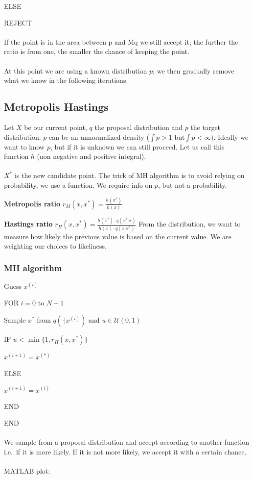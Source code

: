 ELSE

REJECT
\\
\\
\noindent
If the point is in the area between p and Mq we still accept it; the
further the ratio is from one, the smaller the chance of keeping the
point.
\\
\\
\noindent
At this point we are using a known distribution $p$; we then gradually
remove what we know in the following iterations.


\subsection{Metropolis Hastings}

Let $X$ be our current point, $q$ the proposal distribution and $p$ the
target distribution. $p$ can be an unnormalized density
($\int p > 1 \text{ but} \int p < \infty)$. Ideally we want to know $p$,
but if it is unknown we can still proceed. Let us call this function $h$
(non negative and positive integral).
\\
\\
\noindent
$X^*$ is the new candidate point. The trick of MH algorithm is to avoid
relying on probability, we use a function. We require info on $p$, but
not a probability.

\textbf{Metropolis ratio} $r_M(x,x^*)=\frac{h(x^*)}{h(x)}$

\textbf{Hastings ratio}
$r_H(x,x^*)=\frac{h(x^*)\cdot q(x^*|x)}{h(x)\cdot q(x|x^*)}$
\noindent
From the distribution, we want to measure how likely the previous value
is based on the current value. We are weighting our choices to
likeliness.


\subsubsection{MH algorithm}

Guess $x^{(i)}$

FOR $i=0$ to $N-1$

Sample $x^*$ from $q(\cdot|x^{(i)})$ and $u \in \mathcal{U}(0,1)$

IF $u < \min \{1, r_H(x,x^*) \}$

$x^{(i+1)}=x^{(*)}$

ELSE

$x^{(i+1)}=x^{(i)}$

END

END
\\
\\
\noindent
We sample from a proposal distribution and accept according to another
function i.e.~if it is more likely. If it is not more likely, we accept
it with a certain chance.
\\
\\
\noindent
MATLAB plot:


